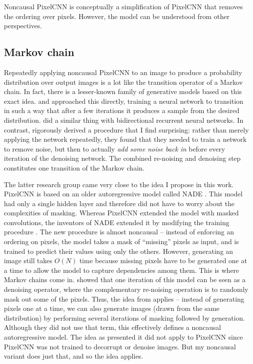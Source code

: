 \documentclass[11pt, a4paper, openany]{book}
\newcommand{\nquote}[1]{``{#1}''}
\begin{document}
Noncausal PixelCNN is conceptually a simplification of PixelCNN that removes the ordering over pixels. However, the model can be understood from other perspectives.

\subsection{Markov chain} \label{markovchain}

Repeatedly applying noncausal PixelCNN to an image to produce a probability distribution over output images is a lot like the transition operator of a Markov chain. In fact, there is a lesser-known family of generative models based on this exact idea. \citet{denoisingthermo} and \citet{infusion} approached this directly, training a neural network to transition in such a way that after a few iterations it produces a sample from the desired distribution. \citet{brnndenoise} did a similar thing with bidirectional recurrent neural networks. In contrast, \citet{denoisinggenerative} rigorously derived a procedure that I find surprising: rather than merely applying the network repeatedly, they found that they needed to train a network to remove noise, but then to actually \emph{add some noise back in} before every iteration of the denoising network. The combined re-noising and denoising step constitutes one transition of the Markov chain.

The latter research group came very close to the idea I propose in this work. PixelCNN is based on an older autoregressive model called NADE \citep{nade}. This model had only a single hidden layer and therefore did not have to worry about the complexities of masking. Whereas PixelCNN extended the model with masked convolutions, the inventors of NADE extended it by modifying the training procedure \citep{dnade,cnade}. The new procedure is almost noncausal -- instead of enforcing an ordering on pixels, the model takes a mask of \nquote{missing} pixels as input, and is trained to predict their values using only the others. However, generating an image still takes $O(N)$ time because missing pixels have to be generated one at a time to allow the model to capture dependencies among them. This is where Markov chains come in. \citet{gsnnade} showed that one iteration of this model can be seen as a denoising operator, where the complementary re-noising operation is to randomly mask out some of the pixels. Thus, the idea from \citet{denoisinggenerative} applies -- instead of generating pixels one at a time, we can also generate images (drawn from the same distribution) by performing several iterations of masking followed by generation. Although they did not use that term, this effectively defines a noncausal autoregressive model. The idea as \citet{gsnnade} presented it did not apply to PixelCNN since PixelCNN was not trained to decorrupt or denoise images. But my noncausal variant does just that, and so the idea applies.
\end{document}
